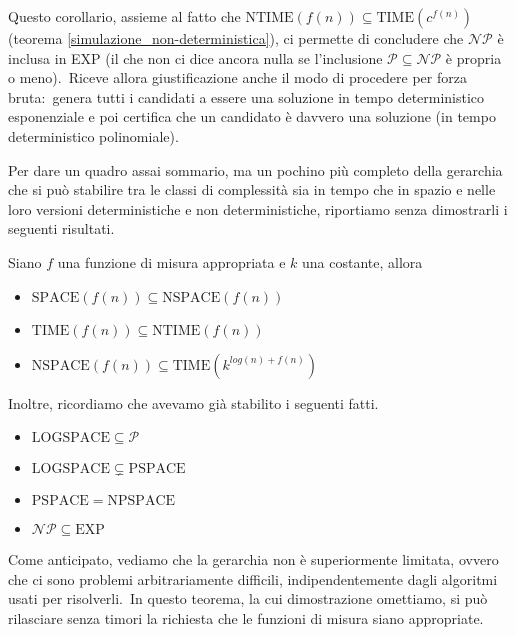 \noindent Questo corollario, assieme al fatto che $\mathrm{NTIME}(f(n)) \subseteq \mathrm{TIME}\left(c^{f(n)}\right)$ (teorema \ref{simulazione_non-deterministica}), ci permette di concludere che $\mathcal{NP}$ è inclusa in EXP (il che non ci dice ancora nulla se l'inclusione $\mathcal{P} \subseteq \mathcal{NP}$ è propria o meno).\
Riceve allora giustificazione anche il modo di procedere per forza bruta:\ genera tutti i candidati a essere una soluzione in tempo deterministico esponenziale e poi certifica che un candidato è davvero una soluzione (in tempo deterministico polinomiale).

\medskip

\noindent Per dare un quadro assai sommario, ma un pochino più completo della gerarchia che si può stabilire tra le classi di complessità sia in tempo che in spazio e nelle loro versioni deterministiche e non deterministiche, riportiamo senza dimostrarli i seguenti risultati.\

\begin{theorem}
    Siano $f$ una funzione di misura appropriata e $k$ una costante, allora
    \begin{itemize}
        \item $\mathrm{SPACE}(f(n)) \subseteq \mathrm{NSPACE}(f(n))$
        \item $\mathrm{TIME}(f(n)) \subseteq \mathrm{NTIME}(f(n))$
        \item $\mathrm{NSPACE}(f(n)) \subseteq \mathrm{TIME}\left(k^{log(n) + f(n)}\right)$
    \end{itemize}
\end{theorem}

\noindent Inoltre, ricordiamo che avevamo già stabilito i seguenti fatti.
\begin{theorem}
    \hfill
    \begin{itemize}
        \item $\mathrm{LOGSPACE} \subseteq \mathcal{P}$
        \item $\mathrm{LOGSPACE} \subsetneq \mathrm{PSPACE}$
        \item $\mathrm{PSPACE} = \mathrm{NPSPACE}$
        \item $\mathcal{NP} \subseteq \mathrm{EXP}$
    \end{itemize}
\end{theorem}

\noindent Come anticipato, vediamo che la gerarchia non è superiormente limitata, ovvero che ci sono problemi arbitrariamente difficili, indipendentemente dagli algoritmi usati per risolverli.\
In questo teorema, la cui dimostrazione omettiamo, si può rilasciare senza timori la richiesta che le funzioni di misura siano appropriate.\

